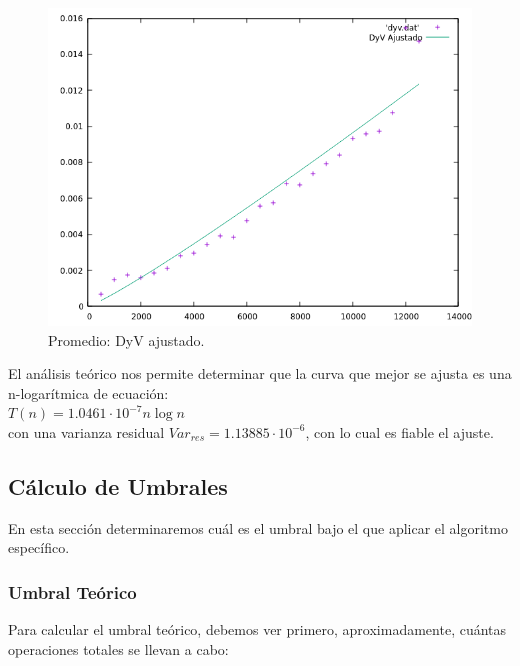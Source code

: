 \documentclass[a4paper,12pt,twoside]{article} %
\begin{document}
\begin{figure}[h]
  \begin{center}
  
  	\includegraphics[scale=0.7]{dyv_ajustado.png}
  	\caption{Promedio: DyV ajustado.}
  	
  \end{center}
\end{figure}

El análisis teórico nos permite determinar que la curva que mejor se ajusta es una n-logarítmica de ecuación:\\

$T(n)= 1.0461 \cdot{10^{-7}} n \log{n}$\\

con una varianza residual $Var_{res} =1.13885 \cdot {10^{-6}}$, con lo cual es fiable el ajuste.

\newpage


\subsection{Cálculo de Umbrales}

En esta sección determinaremos cuál es el umbral bajo el que aplicar el algoritmo específico.


\subsubsection{Umbral Teórico}

Para calcular el umbral teórico, debemos ver primero, aproximadamente, cuántas operaciones totales se llevan a cabo:
\end{document}
